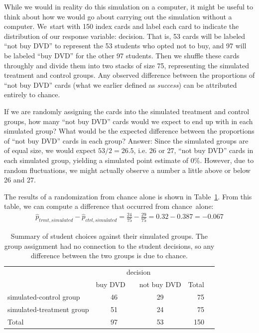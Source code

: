 While we would in reality do this simulation on a computer, it might be useful to think about how we would go about carrying out the simulation without a computer. We~start with 150 index cards and label each card to indicate the distribution of our response variable: decision. That is, 53 cards will be labeled ``not buy DVD'' to represent the 53 students who opted not to buy, and 97 will be labeled ``buy DVD'' for the other 97 students. Then we shuffle these cards throughly and divide them into two stacks of size 75, representing the simulated treatment and control groups. Any observed difference between the proportions of ``not buy DVD'' cards (what we earlier defined as \emph{success}) can be attributed entirely to chance.

\begin{example}{If we are randomly assigning the cards into the simulated treatment and control groups, how many ``not buy DVD'' cards would we expect to end up with in each simulated group? What would be the expected difference between the proportions of ``not buy DVD'' cards in each group?}
Answer: Since the simulated groups are of equal size, we would expect $53 / 2 = 26.5$, i.e. 26 or 27, ``not buy DVD'' cards in each simulated group, yielding a simulated point estimate of 0\%. However, due to random fluctuations, we might actually observe a number a little above or below 26 and 27.
\end{example}

The results of a randomization from chance alone is shown in Table~\ref{OpportunityCostTableSimulated}. From this table, we can compute a difference that occurred from chance~alone:
\begin{align*}
\hat{p}_{trmt, simulated} - \hat{p}_{ctrl, simulated}
  = \frac{24}{75} - \frac{29}{75}
  = 0.32 - 0.387
  = - 0.067
\end{align*}

\begin{table}[ht]
\centering
\begin{tabular}{l cc rr}
& \multicolumn{2}{c}{decision} \\
\cline{2-3}
				& {buy DVD}\ \  	& {not buy DVD} & Total & \hspace{3mm}  \\ 
\cline{1-4}
simulated-control group 		& 46		& 29	& 75 \\ 
simulated-treatment group 	& 51		& 24	& 75 \\ 
\cline{1-4}
Total				& 97		& 53	& 150
\end{tabular}
\caption{Summary of student choices against their simulated groups. The group assignment had no connection to the student decisions, so any difference between the two groups is due to chance.}
\label{OpportunityCostTableSimulated}
\end{table}

